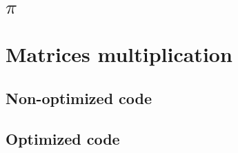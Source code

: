 \chapter{$\pi$}


\label{pi}
\chapter{Matrices multiplication}

\section{Non-optimized code}
\label{matmul}


\section{Optimized code}
\label{matmulot}


